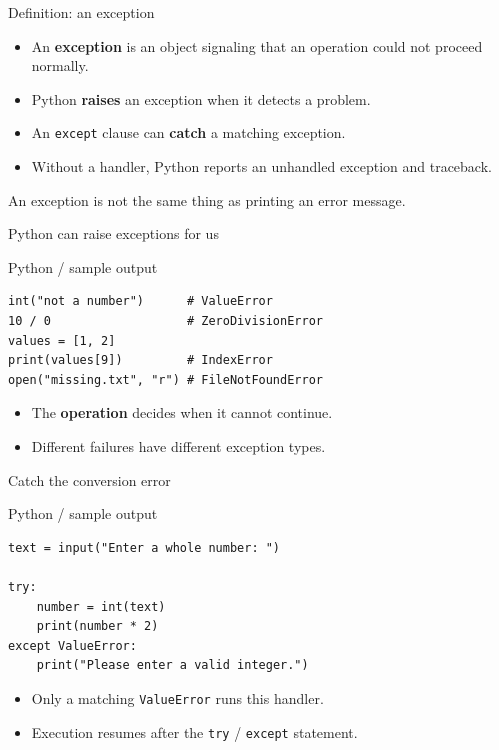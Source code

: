 \documentclass[aspectratio=169,10pt]{beamer}
\begin{document}
\begin{frame}[fragile]{Definition: an exception}
\begin{itemize}\item An \textbf{exception} is an object signaling that an operation could not proceed normally.\item Python \textbf{raises} an exception when it detects a problem.\item An \texttt{except} clause can \textbf{catch} a matching exception.\item Without a handler, Python reports an unhandled exception and traceback.\end{itemize}
\vspace{0.06in}\begin{keyidea}\small An exception is not the same thing as printing an error message.\end{keyidea}
\end{frame}
\begin{frame}[fragile]{Python can raise exceptions for us}
\begin{block}{Python / sample output}
\begin{Verbatim}[fontsize=\footnotesize]
int("not a number")      # ValueError
10 / 0                   # ZeroDivisionError
values = [1, 2]
print(values[9])         # IndexError
open("missing.txt", "r") # FileNotFoundError
\end{Verbatim}
\end{block}
\small\begin{itemize}\item The \textbf{operation} decides when it cannot continue.\item Different failures have different exception types.\end{itemize}
\end{frame}
\begin{frame}[fragile]{Catch the conversion error}
\begin{block}{Python / sample output}
\begin{Verbatim}[fontsize=\footnotesize]
text = input("Enter a whole number: ")

try:
    number = int(text)
    print(number * 2)
except ValueError:
    print("Please enter a valid integer.")
\end{Verbatim}
\end{block}
\small\begin{itemize}\item Only a matching \texttt{ValueError} runs this handler.\item Execution resumes after the \texttt{try} / \texttt{except} statement.\end{itemize}
\end{frame}
\end{document}
